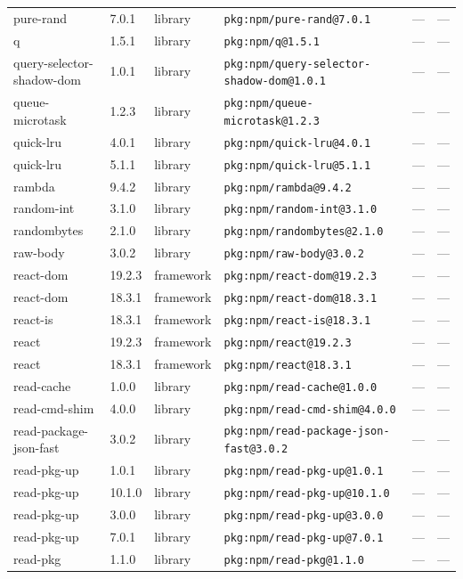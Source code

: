 \documentclass[11pt]{article}
\begin{document}
\begin{longtable}{|l|l|l|p{2.2cm}|l|p{4cm}|}
pure-rand & 7.0.1 & library & \texttt{pkg:npm/pure-rand@7.0.1} & — & — \\
q & 1.5.1 & library & \texttt{pkg:npm/q@1.5.1} & — & — \\
query-selector-shadow-dom & 1.0.1 & library & \texttt{pkg:npm/query-selector-shadow-dom@1.0.1} & — & — \\
queue-microtask & 1.2.3 & library & \texttt{pkg:npm/queue-microtask@1.2.3} & — & — \\
quick-lru & 4.0.1 & library & \texttt{pkg:npm/quick-lru@4.0.1} & — & — \\
quick-lru & 5.1.1 & library & \texttt{pkg:npm/quick-lru@5.1.1} & — & — \\
rambda & 9.4.2 & library & \texttt{pkg:npm/rambda@9.4.2} & — & — \\
random-int & 3.1.0 & library & \texttt{pkg:npm/random-int@3.1.0} & — & — \\
randombytes & 2.1.0 & library & \texttt{pkg:npm/randombytes@2.1.0} & — & — \\
raw-body & 3.0.2 & library & \texttt{pkg:npm/raw-body@3.0.2} & — & — \\
react-dom & 19.2.3 & framework & \texttt{pkg:npm/react-dom@19.2.3} & — & — \\
react-dom & 18.3.1 & framework & \texttt{pkg:npm/react-dom@18.3.1} & — & — \\
react-is & 18.3.1 & framework & \texttt{pkg:npm/react-is@18.3.1} & — & — \\
react & 19.2.3 & framework & \texttt{pkg:npm/react@19.2.3} & — & — \\
react & 18.3.1 & framework & \texttt{pkg:npm/react@18.3.1} & — & — \\
read-cache & 1.0.0 & library & \texttt{pkg:npm/read-cache@1.0.0} & — & — \\
read-cmd-shim & 4.0.0 & library & \texttt{pkg:npm/read-cmd-shim@4.0.0} & — & — \\
read-package-json-fast & 3.0.2 & library & \texttt{pkg:npm/read-package-json-fast@3.0.2} & — & — \\
read-pkg-up & 1.0.1 & library & \texttt{pkg:npm/read-pkg-up@1.0.1} & — & — \\
read-pkg-up & 10.1.0 & library & \texttt{pkg:npm/read-pkg-up@10.1.0} & — & — \\
read-pkg-up & 3.0.0 & library & \texttt{pkg:npm/read-pkg-up@3.0.0} & — & — \\
read-pkg-up & 7.0.1 & library & \texttt{pkg:npm/read-pkg-up@7.0.1} & — & — \\
read-pkg & 1.1.0 & library & \texttt{pkg:npm/read-pkg@1.1.0} & — & — \\

\end{longtable}
\end{document}
